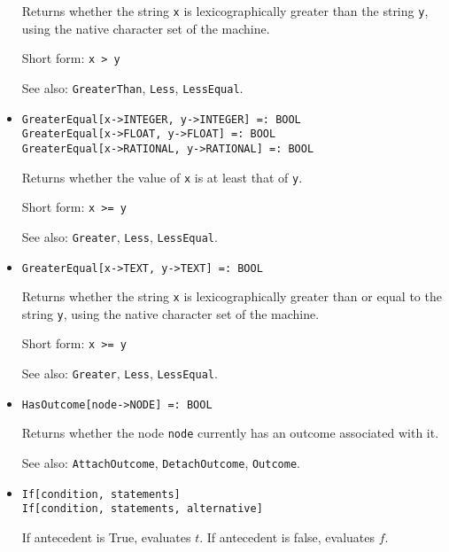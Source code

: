 \begin{itemize}
\bd
Returns whether the string \verb+x+ is lexicographically greater than
the string \verb+y+, using the native character set of the machine.
\item
[Short form:] \verb+x > y+
\item
[See also:] {\tt GreaterThan}, {\tt Less}, {\tt LessEqual}.
\ed

\item
\protect \large \begin{verbatim}
GreaterEqual[x->INTEGER, y->INTEGER] =: BOOL
GreaterEqual[x->FLOAT, y->FLOAT] =: BOOL
GreaterEqual[x->RATIONAL, y->RATIONAL] =: BOOL
\end{verbatim}\normalsize

\bd
Returns whether the value of \verb+x+ is at least that of
\verb+y+.
\item
[Short form:] \verb+x >= y+
\item
[See also:] {\tt Greater}, {\tt Less}, {\tt LessEqual}.
\ed

\item
\protect \large \begin{verbatim}
GreaterEqual[x->TEXT, y->TEXT] =: BOOL
\end{verbatim}\normalsize

\bd
Returns whether the string \verb+x+ is lexicographically greater than
or equal to the string \verb+y+, using the native character set of the
machine.
\item
[Short form:] \verb+x >= y+
\item
[See also:] {\tt Greater}, {\tt Less}, {\tt LessEqual}.
\ed



\item
\protect \large \begin{verbatim}
HasOutcome[node->NODE] =: BOOL
\end{verbatim} \normalsize

\bd
Returns whether the node \verb+node+ currently has an outcome associated
with it.
\item
[See also:] {\tt AttachOutcome}, {\tt DetachOutcome}, {\tt Outcome}.
\ed


\item 
\protect \large \begin{verbatim}
If[condition, statements]
If[condition, statements, alternative]
\end{verbatim} \normalsize
  
\bd
If antecedent is True, evaluates $t$.  If
antecedent is false, evaluates $f$. 
\ed



\end{itemize}
